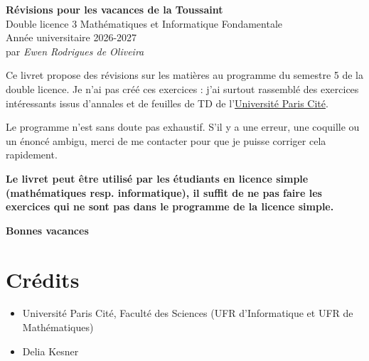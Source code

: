 \documentclass{article}
\begin{document}
\thispagestyle{empty}

\newcommand{\doctitle}{Révisions pour les vacances de la Toussaint}

\vspace*{\fill}

\begin{center}
    {\LARGE\textbf{\doctitle}}\\[0.6em]
    {\Large Double licence 3 Mathématiques et Informatique  Fondamentale}\\[2em]
    {\large Année universitaire 2026-2027}\\[0.25em]
    {\large par \textit{Ewen Rodrigues de Oliveira}}
\end{center}

\vfill

\noindent
Ce livret propose des révisions sur les matières au programme du semestre 5 de la double licence. Je n'ai pas créé ces exercices : j'ai surtout rassemblé des exercices intéressants issus d'annales et de feuilles de TD de l'\href{https://u-pariscite.fr/}{Université Paris Cité}.

\medskip

\noindent
Le programme n'est sans doute pas exhaustif. S'il y a une erreur, une coquille ou un énoncé ambigu, merci de me contacter pour que je puisse corriger cela rapidement.

\medskip


\medskip
\noindent
\textbf{Le livret peut être utilisé par les étudiants en licence simple (mathématiques resp. informatique), il suffit de ne pas faire les exercices qui ne sont pas dans le programme de la licence simple.}

\begin{flushright}
\textbf{Bonnes vacances \faSmile}
\end{flushright}

\newpage

\section*{Crédits}
\begin{itemize}
\item Université Paris Cité, Faculté des Sciences (UFR d'Informatique et UFR de Mathématiques)
\item Delia Kesner
\end{itemize}
\end{document}
